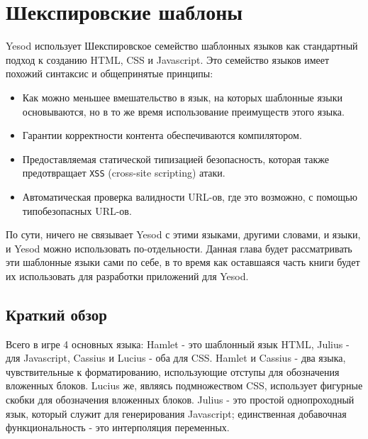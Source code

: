 \chapter{Шекспировские шаблоны}\label{chap:shakespeare}

Yesod использует Шекспировское семейство шаблонных языков как стандартный 
подход к созданию HTML, CSS и Javascript. Это семейство языков имеет похожий 
синтаксис и общепринятые принципы: 

\begin{itemize}
\item Как можно меньшее вмешательство в язык, на которых шаблонные языки 
основываются, но в то же время использование преимуществ этого языка.
\item Гарантии корректности контента обеспечиваются компилятором.
\item Предоставляемая статической типизацией безопасность, которая также 
предотвращает \texttt{XSS} (cross-site scripting) атаки.
\item Автоматическая проверка валидности URL-ов, где это возможно, с помощью 
типобезопасных URL-ов.
\end{itemize}

По сути, ничего не связывает Yesod с этими языками, другими словами, и языки, 
и Yesod можно использовать по-отдельности. Данная глава будет рассматривать 
эти шаблонные языки сами по себе, в то время как оставшаяся часть книги 
будет их использовать для разработки приложений для Yesod.

\section{Краткий обзор}

Всего в игре 4 основных языка: Hamlet - это шаблонный язык HTML, 
Julius - для Javascript, Cassius и Lucius - оба для CSS. Hamlet и Cassius - 
два языка, чувствительные к форматированию, использующие отступы для 
обозначения вложенных блоков. Lucius же, являясь подмножеством CSS, использует
фигурные скобки для обозначения вложенных блоков. 
Julius - это простой однопроходный язык, который служит для 
генерирования Javascript; единственная добавочная функциональность - это 
интерполяция переменных.

